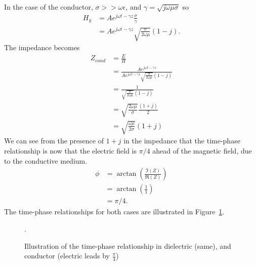 \documentclass{tufte-handout}
\begin{document}
In the case of the conductor, $\sigma >> \omega\epsilon$, and $\gamma = \sqrt{j\omega\mu\sigma}$ so
\begin{align}
H_y &= A e^{j\omega t - \gamma z} \frac{\sigma}{\gamma} \\
 &= A e^{j\omega t - \gamma z} \sqrt{\frac{\sigma}{2\omega\mu}}\left(1-j\right).
\end{align}
The impedance becomes
\begin{align}
Z_{cond} &= \frac{E}{H} \\
&= \frac{A e^{j\omega t - \gamma z}}{A e^{j\omega t - \gamma z} \sqrt{\frac{\sigma}{2\omega\mu}}\left(1-j\right)}\\
& = \frac{1}{ \sqrt{\frac{\sigma}{2\omega\mu}}\left(1-j\right)}\\
& = \sqrt{\frac{2\omega\mu}{\sigma}}\frac{\left(1+j\right)}{2}\\
& = \sqrt{\frac{\omega\mu}{2\sigma}}(1+j)
\end{align}
We can see from the presence of $1+j$ in the impedance that the time-phase relationship is now that the electric field is $\pi/4$ ahead of the magnetic field, due to the conductive medium.
\begin{align}
\phi &= \arctan(\frac{\Im(Z)}{\Re(Z)}) \\
& = \arctan(\frac{1}{1}) \\
& = \pi/4.
\end{align}
The time-phase relationships for both cases are illustrated in Figure~\ref{fig:planewaves}.
\begin{figure}
\label{fig:planewaves}

\caption{Illustration of the time-phase relationship in dielectric (same), and conductor (electric leads by $\frac{\pi}{4}$)}.

\end{figure}
\end{document}
